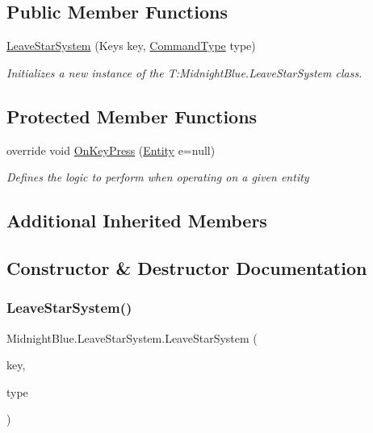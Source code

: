 \subsection*{Public Member Functions}
\begin{DoxyCompactItemize}
\item 
\hyperlink{class_midnight_blue_1_1_leave_star_system_a6793d6a941afd58a9e9030d8aec1fe83}{Leave\+Star\+System} (Keys key, \hyperlink{namespace_m_b2_d_1_1_i_o_ab5f95f3fe9e652778b62bdf943168a68}{Command\+Type} type)
\begin{DoxyCompactList}\small\item\em Initializes a new instance of the T\+:\+Midnight\+Blue.\+Leave\+Star\+System class. \end{DoxyCompactList}\end{DoxyCompactItemize}
\subsection*{Protected Member Functions}
\begin{DoxyCompactItemize}
\item 
override void \hyperlink{class_midnight_blue_1_1_leave_star_system_ad2e048edbe7a4816d9ed8fc87cf4eb91}{On\+Key\+Press} (\hyperlink{class_m_b2_d_1_1_entity_component_1_1_entity}{Entity} e=null)
\begin{DoxyCompactList}\small\item\em Defines the logic to perform when operating on a given entity \end{DoxyCompactList}\end{DoxyCompactItemize}
\subsection*{Additional Inherited Members}


\subsection{Constructor \& Destructor Documentation}
\hypertarget{class_midnight_blue_1_1_leave_star_system_a6793d6a941afd58a9e9030d8aec1fe83}{}\label{class_midnight_blue_1_1_leave_star_system_a6793d6a941afd58a9e9030d8aec1fe83} 
\subsubsection{\texorpdfstring{Leave\+Star\+System()}{LeaveStarSystem()}}
{\footnotesize\ttfamily Midnight\+Blue.\+Leave\+Star\+System.\+Leave\+Star\+System (\begin{DoxyParamCaption}\item[{Keys}]{key,  }\item[{\hyperlink{namespace_m_b2_d_1_1_i_o_ab5f95f3fe9e652778b62bdf943168a68}{Command\+Type}}]{type }\end{DoxyParamCaption})\hspace{0.3cm}{\ttfamily [inline]}}



